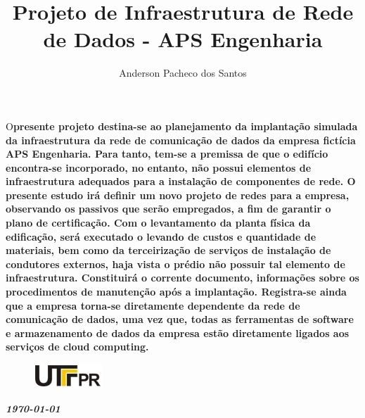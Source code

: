\documentclass[	DIV=calc,%
							paper=a4,%
							fontsize=12pt,%
							onecolumn]{scrartcl}	 					%
\title{Projeto de Infraestrutura de Rede de Dados - APS Engenharia}					%
\author{Anderson Pacheco dos Santos }  	%
\date{}																				%
\newcommand{\initial}[1]{%
     \lettrine[lines=3,lhang=0.3,nindent=0em]{
     				\color{DarkGoldenrod}
     				{\textsf{#1}}}{}}
\begin{document}
\maketitle
\thispagestyle{fancy} 	
\thispagestyle{empty}		%





\initial{O}\textbf{presente projeto destina-se ao planejamento da implantação simulada da infraestrutura da rede de comunicação de dados da empresa fictícia APS Engenharia. Para tanto, tem-se a premissa de que o edifício encontra-se incorporado, no entanto, não possui elementos de infraestrutura adequados para a instalação de componentes de rede. O presente estudo irá definir um novo projeto de redes para a empresa, observando os passivos que serão empregados, a fim de garantir o plano de certificação. Com o levantamento da planta física da edificação, será executado o levando de custos e quantidade de materiais, bem como da terceirização de serviços de instalação de condutores externos, haja vista o prédio não possuir tal elemento de infraestrutura. Constituirá o corrente documento, informações sobre os procedimentos de manutenção após a implantação. Registra-se ainda que a empresa torna-se diretamente dependente da rede de comunicação de dados, uma vez que, todas as ferramentas de software e armazenamento de dados da empresa estão diretamente ligados aos serviços de cloud computing.}


\begin{figure}
	\centering
	\includegraphics{utfpr}
\end{figure}

\vspace{2cm}
\centerline{\textit{\textbf{\today}}}

\clearpage
    \renewcommand*\listfigurename{Lista de figuras}
\listoffigures

\renewcommand*\listtablename{Lista de tabelas}
\listoftables




\clearpage
\renewcommand{\contentsname}{Sumário}
\tableofcontents
\clearpage
\end{document}
